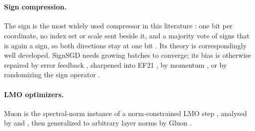 %
%

\section{}\label{app:opt:related}

\paragraph{Sign compression.} The sign is the most widely used compressor in this literature \citep{alistarh2017qsgd,horvath2023stochastic,beznosikov2020biased}: one bit per coordinate, no index set or scale sent beside it, and a majority vote of signs that is again a sign, so both directions stay at one bit \citep{bernstein2019signsgdmajority}. Its theory is correspondingly well developed. SignSGD \citep{bernstein2018signsgd} needs growing batches to converge; its bias is otherwise repaired by error feedback \citep{seide20141bit,karimireddy2019efsign}, sharpened into EF21 \citep{richtarik2021ef21}, by momentum \citep{cutkosky2020momentum,sun2023signmomentum}, or by randomizing the sign operator \citep{chen2020median,safaryan2021ssdm,jin2024stosign}.

\paragraph{LMO optimizers.} Muon \citep{jordan2024muon} is the spectral-norm instance of a norm-constrained LMO step \citep{bernstein2024old,pethick2025training}, analysed by \citet{li2025note} and \citet{kovalev2025understanding}, then generalized to arbitrary layer norms by Gluon \citep{riabinin2025gluon}.

